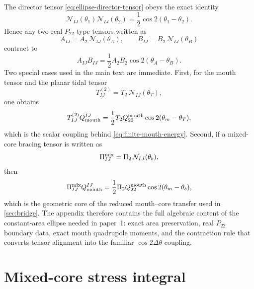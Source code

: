 \documentclass[11pt]{article}
\theoremstyle{plain}
\theoremstyle{definition}
\theoremstyle{remark}
\newcommand{\Ptwotwo}{P_{22}}
\newcommand{\thmouth}{\theta_m}
\begin{document}
The director tensor \cref{eq:ellipse-director-tensor} obeys the exact identity
\begin{equation}
\mathcal N_{IJ}(\theta_1)\mathcal N_{IJ}(\theta_2)
=
\frac12\cos 2(\theta_1-\theta_2).
\label{eq:ellipse-director-contraction}
\end{equation}
Hence any two real \(\Ptwotwo\)-type tensors written as
\begin{equation}
A_{IJ}=A_2\,\mathcal N_{IJ}(\theta_A),
\qquad
B_{IJ}=B_2\,\mathcal N_{IJ}(\theta_B)
\label{eq:ellipse-two-director-tensors}
\end{equation}
contract to
\begin{equation}
A_{IJ}B_{IJ}
=
\frac12 A_2 B_2\cos 2(\theta_A-\theta_B).
\label{eq:ellipse-two-director-contraction}
\end{equation}
Two special cases used in the main text are immediate. First, for the mouth tensor and the planar tidal tensor
\begin{equation}
T_{IJ}^{(2)} = T_2\,\mathcal N_{IJ}(\theta_T),
\label{eq:ellipse-planar-tide-director}
\end{equation}
one obtains
\begin{equation}
T_{IJ}^{(2)}Q_{\rm mouth}^{IJ}
=
\frac12 T_2 Q_{22}^{\rm mouth}\cos 2(\thmouth-\theta_T),
\label{eq:ellipse-mouth-tide-contraction}
\end{equation}
which is the scalar coupling behind \cref{eq:finite-mouth-energy}. Second, if a mixed-core bracing tensor is written as
\begin{equation}
\Pi_{IJ}^{\rm mix}=\Pi_2\,\mathcal N_{IJ}(\theta_b),
\label{eq:ellipse-mixed-core-director}
\end{equation}
then
\begin{equation}
\Pi_{IJ}^{\rm mix}Q_{\rm mouth}^{IJ}
=
\frac12\Pi_2 Q_{22}^{\rm mouth}\cos 2(\thmouth-\theta_b),
\label{eq:ellipse-mouth-core-contraction}
\end{equation}
which is the geometric core of the reduced mouth--core transfer used in \cref{sec:bridge}. The appendix therefore contains the full algebraic content of the constant-area ellipse needed in paper~1: exact area preservation, real \(\Ptwotwo\) boundary data, exact mouth quadrupole moments, and the contraction rule that converts tensor alignment into the familiar \(\cos 2\Delta\theta\) coupling.

\section{Mixed-core stress integral}\label{app:stress}
\end{document}
